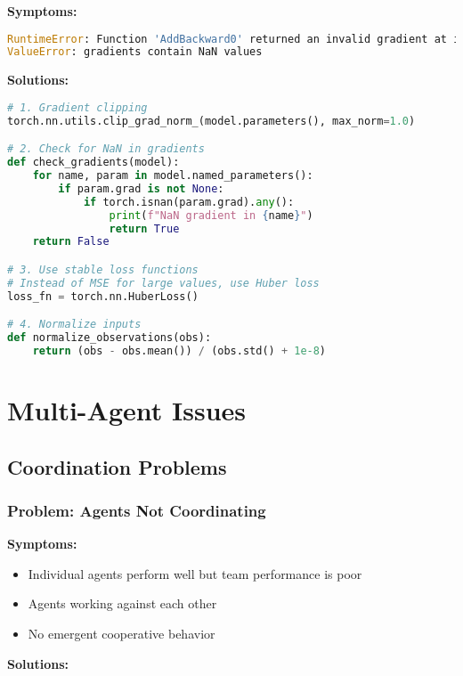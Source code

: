 \textbf{Symptoms:}
\begin{lstlisting}[language=python]
RuntimeError: Function 'AddBackward0' returned an invalid gradient at index 0
ValueError: gradients contain NaN values
\end{lstlisting}

\textbf{Solutions:}

\begin{lstlisting}[language=python, caption=Fix Gradient Issues]
# 1. Gradient clipping
torch.nn.utils.clip_grad_norm_(model.parameters(), max_norm=1.0)

# 2. Check for NaN in gradients
def check_gradients(model):
    for name, param in model.named_parameters():
        if param.grad is not None:
            if torch.isnan(param.grad).any():
                print(f"NaN gradient in {name}")
                return True
    return False

# 3. Use stable loss functions
# Instead of MSE for large values, use Huber loss
loss_fn = torch.nn.HuberLoss()

# 4. Normalize inputs
def normalize_observations(obs):
    return (obs - obs.mean()) / (obs.std() + 1e-8)
\end{lstlisting}

\section{Multi-Agent Issues}

\subsection{Coordination Problems}

\subsubsection{Problem: Agents Not Coordinating}

\textbf{Symptoms:}
\begin{itemize}
    \item Individual agents perform well but team performance is poor
    \item Agents working against each other
    \item No emergent cooperative behavior
\end{itemize}

\textbf{Solutions:}

